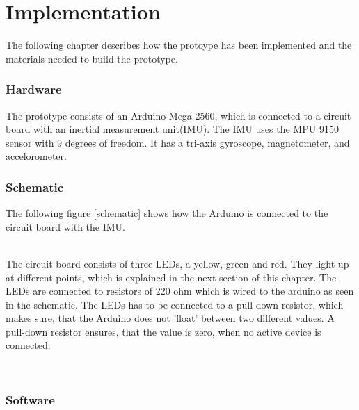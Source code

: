 \chapter{Implementation}

The following chapter describes how the protoype has been implemented and the materials needed to build the prototype. 

\subsection{Hardware}

The prototype consists of an Arduino Mega 2560\citep{Arduino}, which is connected to a circuit board with an inertial measurement unit(IMU). 
The IMU uses the MPU 9150 sensor with 9 degrees of freedom\citep{MPU}. It has a tri-axis gyroscope, magnetometer, and accelorometer.

\subsection{Schematic} 

The following figure \ref{schematic} shows how the Arduino is connected to the circuit board with the IMU. 

\begin{minipage}{\linewidth}%
\label{schematic}
\end{minipage}\\

The circuit board consists of three LEDs, a yellow, green and red. They light up at different points, which is explained in the next section of this chapter.
The LEDs are connected to resistors of 220 ohm which is wired to the arduino as seen in the schematic. The LEDs has to be connected to a pull-down resistor\citep{Pull_down_res},
which makes sure, that the Arduino does not 'float' between two different values. A pull-down resistor ensures, that the value is zero, when no active device is connected. 

\begin{minipage}{\linewidth}%
\label{pull_down}
\end{minipage}\\

\subsection{Software}
